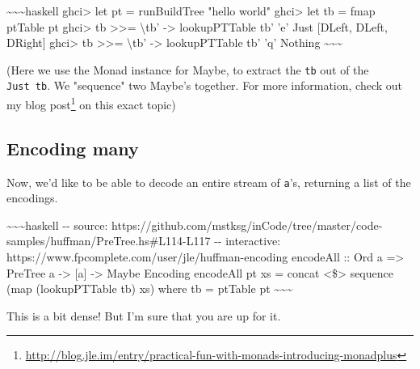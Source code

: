 \documentclass[]{article}
\renewcommand{\href}[2]{#2\footnote{\url{#1}}}
\begin{document}
\textasciitilde{}\textasciitilde{}\textasciitilde{}haskell ghci\textgreater{}
let pt = runBuildTree "hello world" ghci\textgreater{} let tb = fmap ptTable pt
ghci\textgreater{} tb \textgreater{}\textgreater{}= \textbackslash{}tb'
-\textgreater{} lookupPTTable tb' 'e' Just {[}DLeft, DLeft, DRight{]}
ghci\textgreater{} tb \textgreater{}\textgreater{}= \textbackslash{}tb'
-\textgreater{} lookupPTTable tb' 'q' Nothing
\textasciitilde{}\textasciitilde{}\textasciitilde{}

(Here we use the Monad instance for Maybe, to extract the
\texttt{tb\textquotesingle{}} out of the \texttt{Just\ tb}. We "sequence" two
Maybe's together. For more information, check out my
\href{http://blog.jle.im/entry/practical-fun-with-monads-introducing-monadplus}{blog
post} on this exact topic)

\subsection{Encoding many}

Now, we'd like to be able to decode an entire stream of \texttt{a}'s, returning
a list of the encodings.

\textasciitilde{}\textasciitilde{}\textasciitilde{}haskell -\/- source:
https://github.com/mstksg/inCode/tree/master/code-samples/huffman/PreTree.hs\#L114-L117
-\/- interactive: https://www.fpcomplete.com/user/jle/huffman-encoding encodeAll
:: Ord a =\textgreater{} PreTree a -\textgreater{} {[}a{]} -\textgreater{} Maybe
Encoding encodeAll pt xs = concat \textless{}\$\textgreater{} sequence (map
(lookupPTTable tb) xs) where tb = ptTable pt
\textasciitilde{}\textasciitilde{}\textasciitilde{}

This is a bit dense! But I'm sure that you are up for it.
\end{document}
